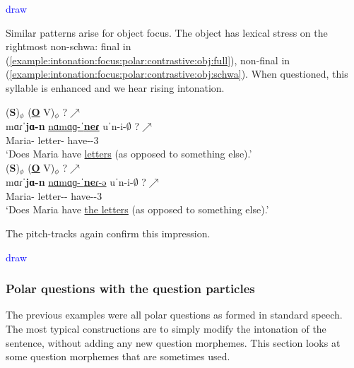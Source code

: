 \textcolor{blue}{draw}


Similar patterns arise for object focus. The object has lexical stress on the rightmost non-schwa: final in (\ref{example:intonation:focus:polar:contrastive:obj:full}), non-final in (\ref{example:intonation:focus:polar:contrastive:obj:schwa}). When questioned, this syllable is enhanced and we hear rising intonation. 


\begin{exe}
	\ex \begin{xlist}
		\ex \glll (\textbf{{S}})$_\phi$ (\textbf{\underline{O}} V)$_\phi$ ?$\nearrow$\\
		{mɑɾˈ\textbf{jɑ-n}} \underline{nɑmɑɡ-ˈ\textbf{neɾ}} uˈn-i-$\emptyset$ ?$\nearrow$ \\
		Maria-{} letter-{\pl} have-{\thgloss}-3{\sg} \\
		\trans `Does {Maria} have \underline{letters} (as opposed to something else).'
		\label{example:intonation:focus:polar:contrastive:obj:full}
		\\ 
		\ex \glll (\textbf{{S}})$_\phi$ (\textbf{\underline{O}} V)$_\phi$ ?$\nearrow$\\
		{mɑɾˈ\textbf{jɑ-n}} \underline{nɑmɑɡ-ˈ\textbf{ne}ɾ-ə} uˈn-i-$\emptyset$ ?$\nearrow$ \\
		Maria-{} letter-{\pl}-{} have-{\thgloss}-3{\sg} \\
		\trans `Does {Maria} have \underline{the letters} (as opposed to something else).'
		\label{example:intonation:focus:polar:contrastive:obj:schwa}
		\\ 
	\end{xlist}
\end{exe}

The pitch-tracks again confirm this impression. 

\textcolor{blue}{draw}

\subsubsection{Polar questions with the question particles}\label{section:intonation:focus:polar:particle}

The previous examples were all polar questions as formed in standard speech. The most typical constructions are to simply modify the intonation of the sentence, without adding any new question morphemes. This section looks at some question morphemes that are sometimes used. 



